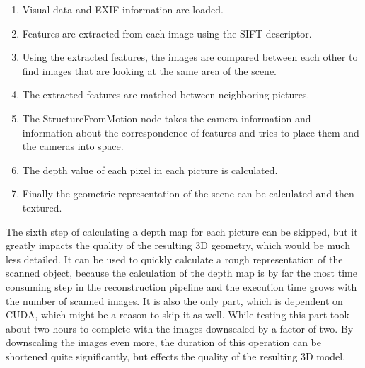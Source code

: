 \begin{enumerate}

\item Visual data and EXIF information are loaded.
\item Features are extracted from each image using the SIFT descriptor.
\item Using the extracted features, the images are compared between each other to find images that are looking at the same area of the scene.
\item The extracted features are matched between neighboring pictures.
\item The StructureFromMotion node takes the camera information and information about the correspondence of features and tries to place them and the cameras into space.
\item The depth value of each pixel in each picture is calculated.
\item Finally the geometric representation of the scene can be calculated and then textured.

\end{enumerate}

The sixth step of calculating a depth map for each picture can be skipped, but it greatly impacts the quality of the resulting 3D geometry, which would be much less detailed.
It can be used to quickly calculate a rough representation of the scanned object, because the calculation of the depth map is by far the most time consuming step in the reconstruction pipeline and the execution time grows with the number of scanned images.
It is also the only part, which is dependent on CUDA, which might be a reason to skip it as well.
While testing this part took about two hours to complete with the images downscaled by a factor of two.
By downscaling the images even more, the duration of this operation can be shortened quite significantly, but effects the quality of the resulting 3D model.









\endinput